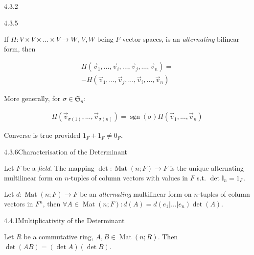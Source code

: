 \documentclass[10pt]{article} %
\DeclareMathOperator{\sgn}{sgn}
\DeclareMathOperator{\Mat}{Mat}
\begin{document}
\begin{multicols}{3}
\begin{remark}{4.3.2}{}
\end{remark}

\begin{remark}{4.3.5}{}

    If $H: V \times V \times \hdots \times V \to W$, $V,W$ being $F$-vector spaces, is an \emph{alternating} bilinear form, then

        \begin{align*}
            H(\vec{v}_1,\hdots,\vec{v}_i,\hdots,\vec{v}_j,\hdots,\vec{v}_n) = \\
            -H(\vec{v}_1,\hdots,\vec{v}_j,\hdots,\vec{v}_i,\hdots,\vec{v}_n)
        \end{align*}

    More generally, for $\sigma \in \mathfrak{S}_n$:

        \begin{align*}
            H(\vec{v}_{\sigma(1)},\hdots,\vec{v}_{\sigma(n)}) = \sgn(\sigma)H(\vec{v}_1,\hdots,\vec{v}_n)
        \end{align*}

    Converse is true provided $1_F + 1_F \neq 0_F$.

\end{remark}

\begin{theorem}{4.3.6}{Characterisation of the Determinant}

    Let $F$ be a \emph{field}. The mapping $\det: \Mat(n;F) \to F$ is the unique alternating multilinear form on $n$-tuples of column vectors with values in $F$ s.t. $\det{\mathbb{I}_n} = 1_F$.

\end{theorem}

\begin{exercise}{64}{}

    Let $d: \Mat(n;F) \to F$ be an \emph{alternating} multilinear form on $n$-tuples of column vectors in $F^n$, then $\forall A \in \Mat(n;F): d(A) = d(e_1|\hdots|e_n)\det{(A)}$.

\end{exercise}

\begin{theorem}{4.4.1}{Multiplicativity of the Determinant}

    Let $R$ be a commutative ring, $A,B \in \Mat(n;R)$. Then $\det\!{(AB)} = (\det{A})(\det{B})$.


\end{theorem}
\end{multicols}
\end{document}
